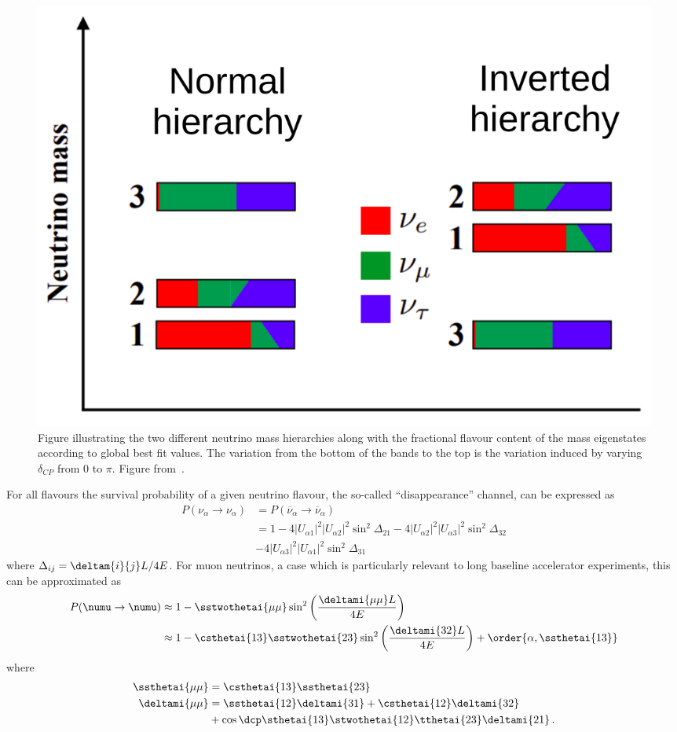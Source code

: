 \begin{figure}[h]
  \centering
  \includegraphics[width=.7\linewidth]{files/figures/theory/mh}
  \caption{Figure illustrating the two different neutrino mass hierarchies along with the fractional flavour content of the mass eigenstates according to global best fit values. The variation from the bottom of the bands to the top is the variation induced by varying $\delta_{CP}$ from 0 to $\pi$. Figure from~\cite{tdrVol2}.}
  \label{fig:massHierarchy}
\end{figure}

For all flavours the survival probability of a given neutrino flavour, the so-called ``disappearance'' channel, can be expressed as~\cite{Nunokawa_2008}
\begin{align}
  P(\nu_{\alpha} \rightarrow \nu_{\alpha}) &= P(\overline{\nu}_{\alpha} \rightarrow \overline{\nu}_{\alpha})\\
  &= 1 - 4|U_{\alpha 1}|^{2} |U_{\alpha 2}|^{2} \sin^{2} \Delta_{21} - 4 |U_{\alpha 2}|^{2} |U_{\alpha 3}|^{2} \sin^{2}\Delta_{32} \\ &- 4 |U_{\alpha 3}|^{2} |U_{\alpha 1}|^{2} \sin^{2} \Delta_{31}
\end{align}
where $\Delta_{ij}=\deltam{i}{j}L/4E$.
For muon neutrinos, a case which is particularly relevant to long baseline accelerator experiments, this can be approximated as~\cite{pdg2018}
\begin{align}
  P(\numu \rightarrow \numu) &\approx 1 - \sstwothetai{\mu\mu} \sin^{2}\left( \frac{\deltami{\mu\mu}L}{4E} \right) \\
  \label{eq:numuSurvival}
  &\approx 1-\csthetai{13}\sstwothetai{23}\sin^{2}\left( \frac{\deltami{32}L}{4E} \right) + \order{\alpha, \ssthetai{13}}
\end{align}
where
\begin{align}
  \ssthetai{\mu\mu} &= \csthetai{13}\ssthetai{23} \\
  \deltami{\mu\mu}  &= \ssthetai{12}\deltami{31}+\csthetai{12}\deltami{32} \\
  &+\cos\dcp\sthetai{13}\stwothetai{12}\tthetai{23}\deltami{21} \, .
\end{align}

